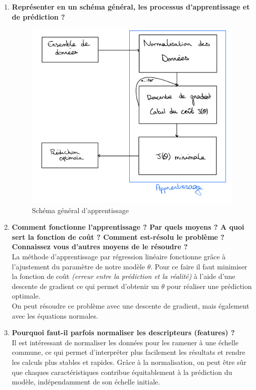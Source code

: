 \begin{enumerate}
\begin{itemize}
    \end{itemize}
    \item \textbf{Représenter en un schéma général, les processus d'apprentissage et de prédiction ?} \\
    \begin{figure}[!h]
        \begin{center}
            \includegraphics[width=.38\textwidth]{./img/schema.jpeg}
            \caption{\label{fig:fig6}Schéma général d'apprentissage}  
        \end{center}
    \end{figure}
    \item \textbf{Comment fonctionne l'apprentissage ? Par quels moyens ? A quoi sert la fonction de coût ? Comment est-résolu le problème ? Connaissez vous d'autres moyens de le résoudre ?} \\
    La méthode d'apprentissage par régression linéaire fonctionne grâce à l'ajustement du paramètre de notre modèle $\theta$. Pour ce faire il faut minimiser la fonction de coût \textit{(erreur entre la prédiction et la réalité)} à l'aide
    d'une descente de gradient ce qui permet d'obtenir un $\theta$ pour réaliser une prédiction optimale. \\
    On peut résoudre ce problème avec une descente de gradient, mais également avec les équations normales.

    \item \textbf{Pourquoi faut-il parfois normaliser les descripteurs (features) ?} \\
    Il est intéressant de normaliser les données pour les ramener à une échelle commune, 
    ce qui permet d'interpréter plus facilement les résultats et rendre les calculs plus stables et rapides. Grâce à la normalisation, on peut être sûr que chaques caractéristiques contribue équitablement à la prédiction du modèle, indépendamment de son échelle initiale. \\
    
\end{enumerate}
